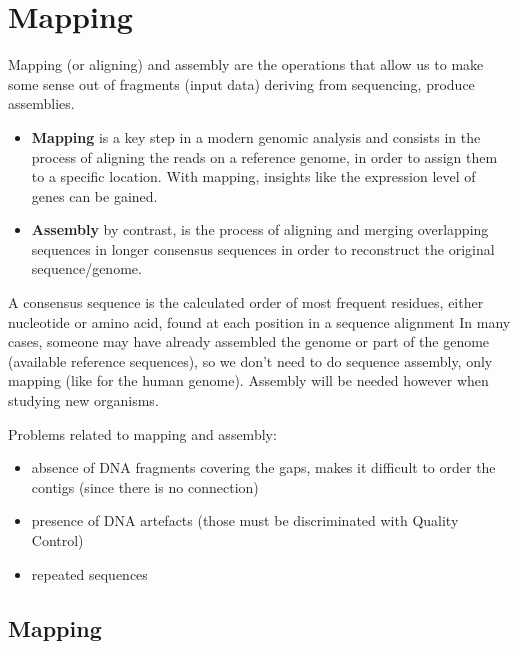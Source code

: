 \graphicspath{{chapters/images/05/}}
\chapter{Mapping}

Mapping (or aligning) and assembly are the operations that allow us to make some sense out of fragments (input data) deriving from sequencing, produce assemblies. 

\begin{itemize}
    \item \textbf{Mapping} is a key step in a modern genomic analysis and consists in the process of aligning the reads on a reference genome, in order to assign them to a specific location. With mapping, insights like the expression level of genes can be gained.
    \item \textbf{Assembly} by contrast, is the process of aligning and merging overlapping sequences in longer consensus sequences in order to reconstruct the original sequence/genome.
\end{itemize}

A consensus sequence is  the calculated order of most frequent residues, either nucleotide or amino acid, found at each position in a sequence alignment
In many cases, someone may have already assembled the genome or part of the genome (available reference sequences), so we don't need to do sequence assembly, only mapping (like for the human genome). Assembly will be needed however when studying new organisms. 

Problems related to mapping and assembly: 

\begin{itemize}
    \item absence of DNA fragments covering the gaps, makes it difficult to order the contigs (since there is no connection)
    \item presence of DNA artefacts (those must be discriminated with Quality Control)
    \item repeated sequences
\end{itemize}

\section{Mapping}


